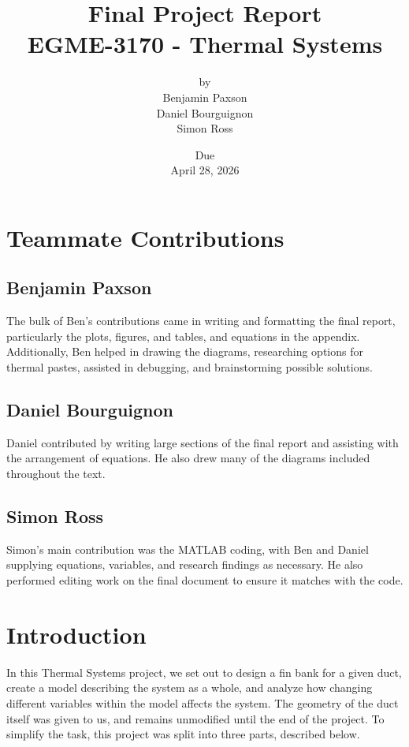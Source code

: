 \documentclass[12pt, titlepage]{article}
\title{\Huge Final Project Report \\ \normalsize{EGME-3170 - Thermal Systems}}
\author{by \\ Benjamin Paxson \\ Daniel Bourguignon \\ Simon Ross}
\date{\footnotesize{Due} \\ \normalsize{April 28, 2026}}
\begin{document}
\maketitle


\section*{Teammate Contributions}
\subsection*{Benjamin Paxson}

The bulk of Ben's contributions came in writing and formatting the final report, particularly the plots, figures, and tables, and equations in the appendix. Additionally, Ben helped in drawing the diagrams, researching options for thermal pastes, assisted in debugging, and brainstorming possible solutions. 

\subsection*{Daniel Bourguignon}

Daniel contributed by writing large sections of the final report and assisting with the arrangement of equations. He also drew many of the diagrams included throughout the text.

\subsection*{Simon Ross}

Simon's main contribution was the MATLAB coding, with Ben and Daniel supplying equations, variables, and research findings as necessary. He also performed editing work on the final document to ensure it matches with the code.

\newpage
\tableofcontents
\listoffigures
\listoftables

\newpage
\section{Introduction}

In this Thermal Systems project, we set out to design a fin bank for a given duct,  create a model describing the system as a whole, and analyze how changing different variables within the model affects the system. The geometry of the duct itself was given to us, and remains unmodified until the end of the project. To simplify the task, this project was split into three parts, described below.
\end{document}
